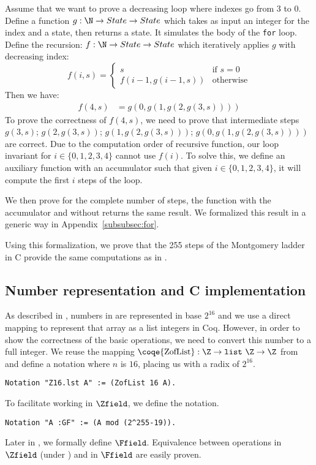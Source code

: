 Assume that we want to prove a decreasing loop where indexes go from 3 to 0.
Define a function $g : \N \rightarrow State  \rightarrow State $ which takes as
input an integer for the index and a state, then returns a state.
It simulates the body of the \texttt{for} loop.
Define the recursion: $f : \N \rightarrow State \rightarrow State $ which
iteratively applies $g$ with decreasing index:
\begin{equation*}
  f ( i , s ) =
  \begin{cases}
  s & \text{if } s = 0 \\
  f( i - 1 , g ( i - 1  , s )) & \text{otherwise}
  \end{cases}
\end{equation*}
Then we have:
\begin{align*}
  f(4,s) &= g(0,g(1,g(2,g(3,s))))
\end{align*}
To prove the correctness of $f(4,s)$, we need to prove that intermediate steps
$g(3,s)$; $g(2,g(3,s))$; $g(1,g(2,g(3,s)))$; $g(0,g(1,g(2,g(3,s))))$ are correct.
Due to the computation order of recursive function, our loop invariant for
$i\in\{0,1,2,3,4\}$ cannot use $f(i)$.
To solve this, we define an auxiliary function with an accumulator such that
given $i\in\{0,1,2,3,4\}$, it will compute the first $i$ steps of the loop.

We then prove for the complete number of steps, the function with the accumulator
and without returns the same result.
We formalized this result in a generic way in Appendix~\ref{subsubsec:for}.

Using this formalization, we prove that the 255 steps of the Montgomery ladder
in C provide the same computations as in .





\subsection{Number representation and C implementation}
\label{subsec:num-repr-rfc}

As described in , numbers in  are represented
in base $2^{16}$ and we use a direct mapping to represent that array as a list
integers in Coq. However, in order to show the correctness of the basic operations,
we need to convert this number to a full integer.
We reuse the mapping
$\text{\coqe{ZofList}} : \Z \rightarrow \texttt{list}~\Z \rightarrow \Z$ from 
and define a notation where $n$ is $16$, placing us with a radix of $2^{16}$.
\begin{lstlisting}[language=Coq]
Notation "Z16.lst A" := (ZofList 16 A).
\end{lstlisting}
To facilitate working in $\Zfield$, we define the  notation.
\begin{lstlisting}[language=Coq]
Notation "A :GF" := (A mod (2^255-19)).
\end{lstlisting}
Later in , we formally define $\Ffield$.
Equivalence between operations in $\Zfield$ (\ie under ) and in $\Ffield$ are easily proven.

